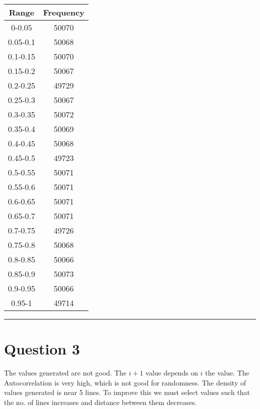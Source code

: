 \documentclass{article}
\begin{document}
\begin{center} \begin{tabular}{||c | c||}  \hline
		Range & Frequency \\ [0.5ex] \hline \hline0-0.05 & 50070\\
		\hline 
		0.05-0.1 & 50068\\
		\hline 
		0.1-0.15 & 50070\\
		\hline 
		0.15-0.2 & 50067\\
		\hline 
		0.2-0.25 & 49729\\
		\hline 
		0.25-0.3 & 50067\\
		\hline 
		0.3-0.35 & 50072\\
		\hline 
		0.35-0.4 & 50069\\
		\hline 
		0.4-0.45 & 50068\\
		\hline 
		0.45-0.5 & 49723\\
		\hline 
		0.5-0.55 & 50071\\
		\hline 
		0.55-0.6 & 50071\\
		\hline 
		0.6-0.65 & 50071\\
		\hline 
		0.65-0.7 & 50071\\
		\hline 
		0.7-0.75 & 49726\\
		\hline 
		0.75-0.8 & 50068\\
		\hline 
		0.8-0.85 & 50066\\
		\hline 
		0.85-0.9 & 50073\\
		\hline 
		0.9-0.95 & 50066\\
		\hline 
		0.95-1 & 49714\\
		\hline 
	\end{tabular} 
\end{center}

\pagebreak

\begin {figure}
\begin{center}
	
\end{center}
\end {figure}
\noindent\rule[0.5ex]{\linewidth}{1pt}

\pagebreak

\section{Question 3}
The values generated are not good. The $i+1$ value depends on $i$ the value. The Autocorrelation is very high, which is not good for randomness. The density of values generated is near 5 lines. To improve this we must select values such that the no. of lines increases and distance between them decreases.
\end{document}

